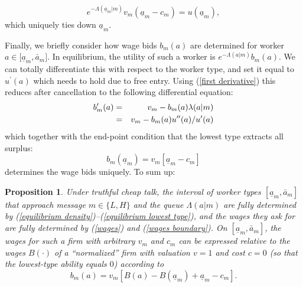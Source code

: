 \documentclass[12pt]{article}
\newtheorem{prop}{Proposition}
\begin{document}
\begin{equation}
e^{-\Lambda (\underline{a}_{m}|m)}v_{m}(\underline{a}_{m}-c_{m})=u(%
\underline{a}_{m}),  \label{equilibrium lowest type}
\end{equation}%
which uniquely ties down $\underline{a}_{m}.$

Finally, we briefly consider how wage bids $b_{m}(a)$ are determined for
worker $a\in \lbrack \underline{a}_{m},\bar{a}_{m}]$. In equilibrium, the
utility of such a worker is $e^{-\Lambda (a|m)}b_{m}(a)$. We can totally
differentiate this with respect to the worker type, and set it equal to $%
u^{\prime }(a)$ which needs to hold due to free entry. Using (\ref{first
derivative}) this reduces after cancellation to the following differential
equation: 
\begin{eqnarray}
b_{m}^{\prime }(a) &=&v_{m}-b_{m}(a)\lambda (a|m)  \notag \\
&=&v_{m}-b_{m}(a)u^{\prime \prime }(a)/u^{\prime }(a)  \label{wages}
\end{eqnarray}%
which together with the end-point condition that the lowest type extracts all
surplus:
\begin{equation}
b_{m}(\underline{a}_{m})=v_{m}[\underline{a}_{m}-c_{m}]
\label{wages boundary}
\end{equation}%
determines the wage bids uniquely. To sum up:

\begin{prop}
\label{equilibrium-characterization}\label{workers}Under truthful cheap talk, the interval of worker types $[\underline{a}_{m},\bar{a}_{m}]$ that approach message $m\in\{L,H\}$ and the queue $\Lambda(a|m)$ are fully determined by (\ref{equilibrium density})--(\ref{equilibrium lowest type}), and the wages they ask for are fully determined by (\ref{wages}) and (\ref{wages boundary}). On $[\underline{a}_{m},\bar{a}_{m}]$, the wages for such a firm with arbitrary $v_{m}$ and $c_{m}$ can be expressed relative to the wages $B(\cdot)$ of a ``normalized'' firm with valuation $v=1$ and cost $c=0$ (so that the lowest-type ability equals $0$) according to
\begin{equation}
b_{m}(a)=v_{m}[B(a)-B(\underline{a}_{m})+\underline{a}_{m}-c_{m}].
\label{bidding1}
\end{equation}
\end{prop}

\bigskip
\end{document}
